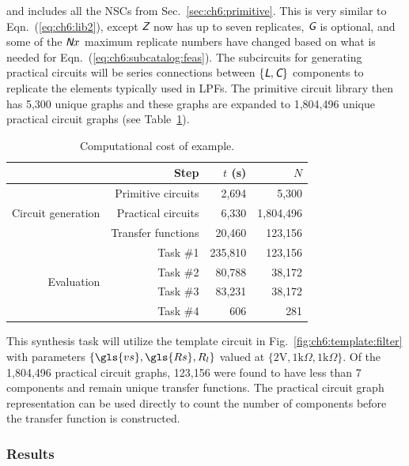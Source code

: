 \noindent and includes all the NSCs from Sec.~\ref{sec:ch6:primitive}.
This is very similar to Eqn.~(\ref{eq:ch6:lib2}), except $\textsl{\textsf{Z}}$ now has up to seven replicates, $\textsl{\textsf{G}}$ is optional, and some of the $\textsl{\textsf{N}}x$ maximum replicate numbers have changed based on what is needed for Eqn.~(\ref{eq:ch6:subcatalog:feas}).
The subcircuits for generating practical circuits will be series connections between $\{\textsl{\textsf{L}},\textsl{\textsf{C}}\}$ components to replicate the elements typically used in LPFs.
The primitive circuit library then has 5,300 unique graphs and these graphs are expanded to 1,804,496 unique practical circuit graphs (see Table~\ref{tb:ch6:lpf:computational}).

\begin{table}[ht]
\centering
\caption{Computational cost of  example.\label{tb:ch6:lpf:computational}}
\begin{tabular}{rrrr}
\hline \hline
 & Step                   & $t$ (s) & $N$ \\
\hline
\multirow{3}{*}{Circuit generation} & Primitive circuits  & 2,694 & 5,300  \\
 & Practical circuits & 6,330  & 1,804,496  \\
 & Transfer functions & 20,460 & 123,156   \\
 \multirow{4}{*}{Evaluation}        & Task \#1 & 235,810 & 123,156     \\
 & Task \#2 & 80,788 &  38,172   \\
 & Task \#3 & 83,231 & 38,172    \\
 & Task \#4 & 606 & 281    \\
\hline \hline
\end{tabular}
\end{table}

This synthesis task will utilize the template circuit in Fig.~\ref{fig:ch6:template:filter} with parameters $\{\gls{vs},\gls{Rs},R_l\}$ valued at $\{2 \text{V}, 1 \text{k}\Omega, 1 \text{k}\Omega\}$.
Of the 1,804,496 practical circuit graphs, 123,156 were found to have less than 7 components and remain unique transfer functions.
The practical circuit graph representation can be used directly to count the number of components before the transfer function is constructed.

\subsubsection{Results}

